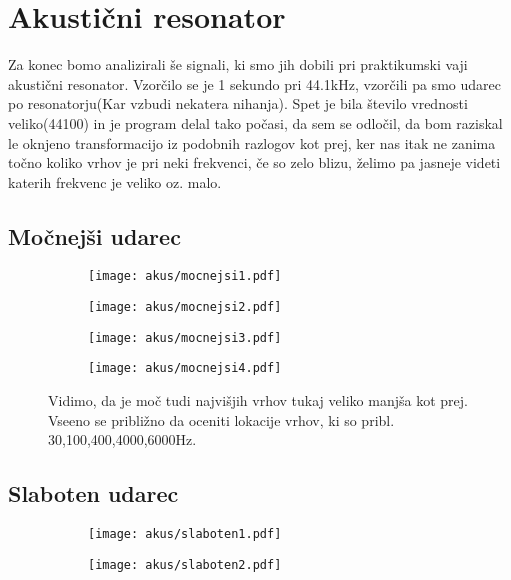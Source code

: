 \documentclass{article}
\begin{document}
\section{Akustični resonator}
Za konec bomo analizirali še signali, ki smo jih dobili pri praktikumski vaji akustični resonator. Vzorčilo se je 1 sekundo pri 44.1kHz, vzorčili pa smo udarec po resonatorju(Kar vzbudi nekatera nihanja).
Spet je bila število vrednosti veliko(44100) in je program delal tako počasi, da sem se odločil, da bom raziskal le oknjeno transformacijo iz podobnih razlogov kot prej, ker nas itak ne zanima točno
koliko vrhov je pri neki frekvenci, če so zelo blizu, želimo pa jasneje videti katerih frekvenc je veliko oz. malo.
\subsection{Močnejši udarec}
\begin{figure}[H]
\begin{subfigure}{.5\textwidth}
\texttt{[image: akus/mocnejsi1.pdf]}

\end{subfigure}
\begin{subfigure}{.5\textwidth}
\texttt{[image: akus/mocnejsi2.pdf]}
\end{subfigure}
\end{figure}
\begin{figure}[H]
\begin{subfigure}{.5\textwidth}
\texttt{[image: akus/mocnejsi3.pdf]}

\end{subfigure}
\begin{subfigure}{.5\textwidth}
\texttt{[image: akus/mocnejsi4.pdf]}
\end{subfigure}
\caption*{Vidimo, da je moč tudi najvišjih vrhov tukaj veliko manjša kot prej. Vseeno se približno da oceniti lokacije vrhov, ki so pribl. 30,100,400,4000,6000Hz.}
\end{figure}

\subsection{Slaboten udarec}
\begin{figure}[H]
\begin{subfigure}{.5\textwidth}
\texttt{[image: akus/slaboten1.pdf]}
\end{subfigure}
\begin{subfigure}{.5\textwidth}
\texttt{[image: akus/slaboten2.pdf]}
\end{subfigure}
\end{figure}
\end{document}
